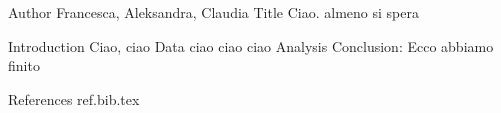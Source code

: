 Author Francesca, Aleksandra, Claudia	
Title Ciao. almeno si spera

Introduction Ciao, ciao
Data ciao ciao ciao
Analysis
Conclusion: Ecco abbiamo finito

References 
ref.bib.tex
